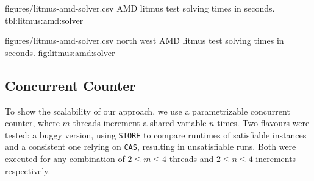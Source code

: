 
\SolverStatsTable
  {figures/litmus-amd-solver.csv}
  {\textnumero}
  {\AMDRowHeader}
  {AMD litmus test solving times in seconds.}
  {tbl:litmus:amd:solver}

\SolverStatsGraph
  {figures/litmus-amd-solver.csv}
  {north west}
  {AMD litmus test solving times in seconds.}
  {fig:litmus:amd:solver}

\newpage

\subsection*{Concurrent Counter}

\newcommand{\tikzmark}[1]{\tikz[overlay,remember picture] \node (#1) {};}
\newcommand*{\AddNote}[3]{%
    \begin{tikzpicture}[overlay, remember picture]
        \draw [decoration={brace,amplitude=0.5em},decorate,thick,red!60!black]
            ($(#1)!([yshift=1.5ex]#1)!($(#1)-(0,1)$)$) --
            ($(#1)!(#2)!($(#1)-(0,1)$)$)
            node [align=center, text width=1.0cm, pos=0.5, anchor=west] {\textsf{#3}};
    \end{tikzpicture}
}%


To show the scalability of our approach, we use a parametrizable concurrent counter, where $m$ threads increment a shared variable $n$ times.
Two flavours were tested: a buggy version, using \lstinline[style=asm]{STORE} to compare runtimes of satisfiable instances and a consistent one relying on \lstinline[style=asm]{CAS}, resulting in unsatisfiable runs.
Both were executed for any combination of $2 \leq m \leq 4$ threads and $2 \leq n \leq 4$ increments respectively.

